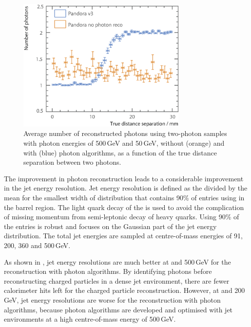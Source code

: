 \begin{figure}[!tbph]
\centering
\includegraphics[width=0.75\textwidth]{photon/nPhotonVSnoPhotonReco3}
\caption[Average number of photons using two photons of 500 and 50\,GeV per event sample.]
{Average number of reconstructed  photons using two-photon samples with photon energies of  500\,GeV and 50\,GeV, without (orange) and with (blue) photon algorithms, as a function of the true distance separation between two photons.}
\label{fig:photonDoublePerformanceNoReco}
\end{figure}




The improvement in photon reconstruction leads to a considerable improvement in the jet energy resolution. Jet energy resolution is defined as the \rms divided by the mean for the smallest width of distribution that contains 90\% of entries using \eeZuds in the  barrel region. The light quark decay of the \Zprime is used   to avoid the complication of missing momentum from semi-leptonic decay of heavy quarks. Using 90\% of the entries is robust and focuses on the Gaussian part of the jet energy distribution. The total jet energies are   sampled at centre-of-mass energies of 91, 200, 360 and 500\,GeV.

As shown in , jet energy resolutions are much better at  and 500\,GeV for the reconstruction with photon algorithms. By identifying photons before reconstructing charged particles in a dense jet environment, there are fewer calorimeter hits left for the charged particle reconstruction. However, at  and 200\,GeV, jet energy resolutions are worse  for the reconstruction with photon algorithms, because photon algorithms are developed and optimised with  jet environments at a high centre-of-mass energy of 500\,GeV.

